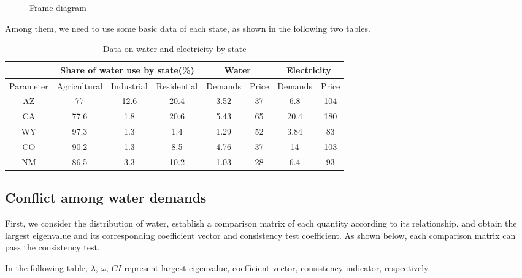 \documentclass{mcmthesis}
\begin{document}
\begin{figure}[h]
	\caption{Frame diagram}
\end{figure}

Among them, we need to use some basic data of each state, as shown in the following two tables.
\begin{table}[h]
	\centering
	\caption{Data on water and electricity by state}
	\begin{tabular}{cccccccc}
		\hline  
		\multicolumn{1}{l}{} & \multicolumn{3}{c}{Share of water use by state(\%)} & \multicolumn{2}{c}{Water} & \multicolumn{2}{c}{Electricity} \\
		\hline  
		Parameter            & Agricultural     & Industrial     & Residential     & Demands      & Price      & Demands         & Price         \\
		\hline  
		AZ                   & 77               & 12.6           & 20.4            & 3.52         & 37         & 6.8             & 104           \\
		CA                   & 77.6             & 1.8            & 20.6            & 5.43         & 65         & 20.4            & 180           \\
		WY                   & 97.3             & 1.3            & 1.4             & 1.29         & 52         & 3.84            & 83            \\
		CO                   & 90.2             & 1.3            & 8.5             & 4.76         & 37         & 14              & 103           \\
		NM                   & 86.5             & 3.3            & 10.2            & 1.03         & 28         & 6.4             & 93        \\
		\hline     
	\end{tabular}
\end{table}
\subsection{Conflict among water demands}
First, we consider the distribution of water, establish a comparison matrix of each quantity according to its relationship, and obtain the largest eigenvalue and its corresponding coefficient vector and consistency test coefficient. As shown below, each comparison matrix can pass the consistency test.

In the following table, $\lambda$, $\omega$, $CI$ represent largest eigenvalue, coefficient vector, consistency indicator, respectively.
\end{document}
